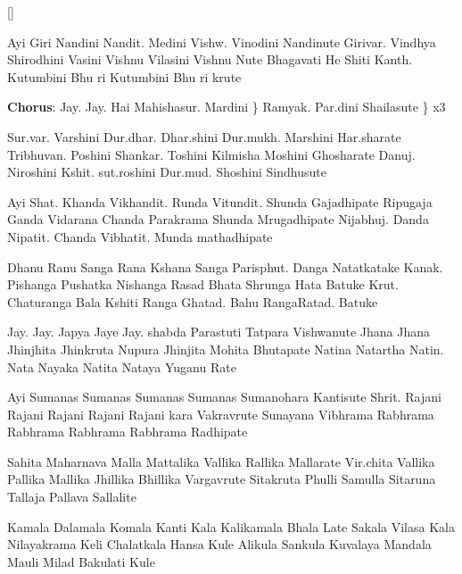 
\chordsoff

[]

    \beginverse
        Ayi Giri Nandini Nandit. Medini
        Vishw. Vinodini Nandinute
        Girivar. Vindhya Shirodhini Vasini 
        Vishnu Vilasini Vishnu Nute 
        Bhagavati He Shiti Kanth. Kutumbini 
        Bhu ri Kutumbini Bhu ri krute
    \endverse
    
    \beginchorus
        {\bf Chorus}: 
        Jay. Jay. Hai Mahishasur. Mardini \} 
        Ramyak. Par.dini Shailasute \} x3 
    \endchorus
    
    \beginverse
        Sur.var. Varshini Dur.dhar. Dhar.shini 
        Dur.mukh. Marshini Har.sharate  
        Tribhuvan. Poshini Shankar. Toshini 
        Kilmisha Moshini Ghosharate 
        Danuj. Niroshini Kshit. sut.roshini 
        Dur.mud. Shoshini Sindhusute 
    \endverse
    
    \beginverse
        Ayi Shat. Khanda Vikhandit. Runda 
        Vitundit. Shunda Gajadhipate 
        Ripugaja Ganda Vidarana Chanda 
        Parakrama Shunda Mrugadhipate 
        Nijabhuj. Danda Nipatit. Chanda 
        Vibhatit. Munda mathadhipate 
    \endverse
    
    \beginverse
        Dhanu Ranu Sanga Rana Kshana Sanga 
        Parisphut. Danga Natatkatake 
        Kanak. Pishanga Pushatka Nishanga 
        Rasad Bhata Shrunga Hata Batuke 
        Krut. Chaturanga Bala Kshiti Ranga 
        Ghatad. Bahu RangaRatad. Batuke 
    \endverse
    
    \beginverse
        Jay. Jay. Japya Jaye Jay. shabda 
        Parastuti Tatpara Vishwanute 
        Jhana Jhana Jhinjhita Jhinkruta Nupura 
        Jhinjita Mohita Bhutapate 
        Natina Natartha Natin. Nata Nayaka 
        Natita Nataya Yuganu Rate 
    \endverse
    
    \beginverse
        Ayi Sumanas Sumanas Sumanas 
        Sumanas Sumanohara Kantisute 
        Shrit. Rajani Rajani Rajani 
        Rajani Rajani kara Vakravrute 
        Sunayana Vibhrama Rabhrama Rabhrama 
        Rabhrama Rabhrama Radhipate 
    \endverse
    
    \beginverse
        Sahita Maharnava Malla Mattalika 
        Vallika Rallika Mallarate 
        Vir.chita Vallika Pallika Mallika 
        Jhillika Bhillika Vargavrute 
        Sitakruta Phulli Samulla Sitaruna 
        Tallaja Pallava Sallalite 
    \endverse
    
    \beginverse
        Kamala Dalamala Komala Kanti 
        Kala Kalikamala Bhala Late 
        Sakala Vilasa Kala Nilayakrama 
        Keli Chalatkala Hansa Kule 
        Alikula Sankula Kuvalaya Mandala 
        Mauli Milad Bakulati Kule 
    \endverse

\endsong

\newpage